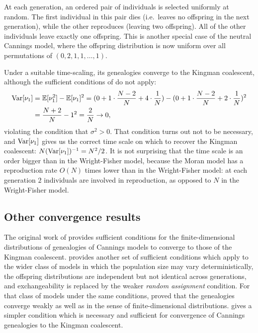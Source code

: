At each generation, an ordered pair of individuals is selected uniformly at random. The first individual in this pair dies (i.e.\ leaves no offspring in the next generation), while the other reproduces (leaving two offspring). All of the other individuals leave exactly one offspring.
This is another special case of the neutral Cannings model, where the offspring distribution is now uniform over all permutations of $(0,2,1,1,\dots,1)$.

Under a suitable time-scaling, its genealogies converge to the Kingman coalescent,
although the sufficient conditions of \textcite{kingman1982gene} do not apply:
\begin{align*}
\operatorname{Var}[\nu_1] 
&= \mathbb{E}[\nu_1^2] - \mathbb{E}[\nu_1]^2
= (0 + 1 \cdot \frac{N-2}{N} + 4 \cdot \frac{1}{N}) - (0 + 1 \cdot \frac{N-2}{N} + 2 \cdot \frac{1}{N})^2 \\
&= \frac{N+2}{N} - 1^2
= \frac{2}{N}
\to 0 ,
\end{align*}
violating the condition that $\sigma^2 >0$. 
That condition turns out not to be necessary, and $\operatorname{Var}[\nu_1]$ gives us the correct time scale on which to recover the Kingman coalescent: $N(\operatorname{Var}[\nu_1])^{-1} = N^2/2$.
It is not surprising that the time scale is an order bigger than in the Wright-Fisher model, because the Moran model has a reproduction rate $O(N)$ times lower than in the Wright-Fisher model: at each generation $2$ individuals are involved in reproduction, as opposed to $N$ in the Wright-Fisher model.




\subsection{Other convergence results}
\label{sec:previousgeneconv}
The original work of \textcite{kingman1982gene} provides sufficient conditions for the finite-dimensional distributions of genealogies of Cannings models to converge to those of the Kingman coalescent.
\textcite{mohle1998} provides another set of sufficient conditions which apply to the wider class of models in which the population size may vary deterministically, the offspring distributions are independent but not identical across generations, and exchangeability is replaced by the weaker \emph{random assignment} condition. 
For that class of models under the same conditions, \textcite{mohle1999} proved that the genealogies converge weakly as well as in the sense of finite-dimensional distributions.
\textcite{mohle2000} gives a simpler condition which is necessary and sufficient for convergence of Cannings genealogies to the Kingman coalescent. %

